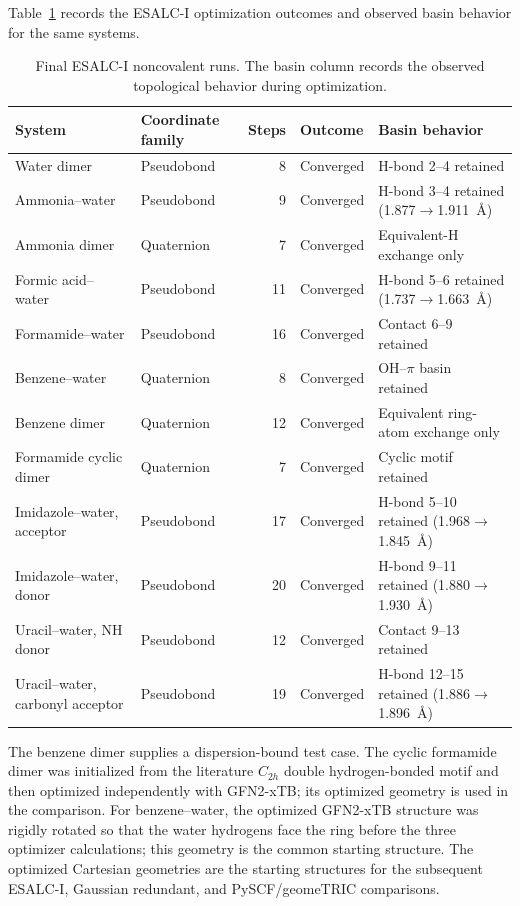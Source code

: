 \documentclass[10pt]{article}
\begin{document}
{{Table~\ref{tab:noncovalent-sonic-summary} records the ESALC-I
optimization outcomes and observed basin behavior for the same systems.}

\begin{table}[htbp]
\centering
\scriptsize
\setlength{\tabcolsep}{3.5pt}
\caption{Final ESALC-I noncovalent runs.  The basin column records the observed
topological behavior during optimization.}
\label{tab:noncovalent-sonic-summary}
\begin{tabularx}{\linewidth}{@{}l l r l X@{}}
\toprule
System & {Coordinate family} & Steps & Outcome & Basin behavior \\
\midrule
Water dimer & Pseudobond & 8 & Converged & H-bond 2--4 retained \\
Ammonia--water & Pseudobond & 9 & Converged & H-bond 3--4 retained (1.877\(\rightarrow\)1.911~\AA) \\
Ammonia dimer & Quaternion & 7 & Converged & Equivalent-H exchange only \\
Formic acid--water & Pseudobond & 11 & Converged & H-bond 5--6 retained (1.737\(\rightarrow\)1.663~\AA) \\
Formamide--water & Pseudobond & 16 & Converged & Contact 6--9 retained \\
Benzene--water & Quaternion & 8 & Converged & OH--\(\pi\) basin retained \\
Benzene dimer & Quaternion & 12 & Converged & Equivalent ring-atom exchange only \\
Formamide cyclic dimer & Quaternion & 7 & Converged & Cyclic motif retained \\
Imidazole--water, acceptor & Pseudobond & 17 & Converged & H-bond 5--10 retained (1.968\(\rightarrow\)1.845~\AA) \\
Imidazole--water, donor & Pseudobond & 20 & Converged & H-bond 9--11 retained (1.880\(\rightarrow\)1.930~\AA) \\
Uracil--water, NH donor & Pseudobond & 12 & Converged & Contact 9--13 retained \\
Uracil--water, carbonyl acceptor & Pseudobond & 19 & Converged & H-bond 12--15 retained (1.886\(\rightarrow\)1.896~\AA) \\
\bottomrule
\end{tabularx}
\end{table}

The benzene dimer supplies a dispersion-bound test case.  The
cyclic formamide dimer was initialized from the literature \(C_{2h}\) double
hydrogen-bonded motif and then optimized independently with GFN2-xTB; its
optimized geometry is used in the comparison.
For benzene--water, the optimized GFN2-xTB structure was rigidly rotated so
that the water hydrogens face the ring before the three optimizer calculations;
{this geometry is the common starting structure.}
The optimized Cartesian geometries are
the starting structures for the subsequent ESALC-I, Gaussian redundant, and
PySCF/geomeTRIC comparisons.\cite{WangSong2016GeomeTRIC}

}
\end{document}
